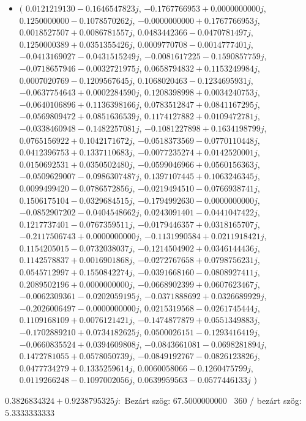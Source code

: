 \documentclass[14pt,a4paper]{article}
\begin{document}
\begin{itemize}
\item
$\big($
$0.0121219130-0.1646547823j$, $-0.1767766953+0.0000000000j$, $0.1250000000-0.1078570262j$, $-0.0000000000+0.1767766953j$, $0.0018527507+0.0086781557j$, $0.0483442366-0.0470781497j$, $0.1250000389+0.0351355426j$, $0.0009770708-0.0014777401j$, $-0.0413169027-0.0431515249j$, $-0.0081617225-0.1590857759j$, $-0.0718657946-0.0032721975j$, $0.0658794832+0.1153249984j$, $0.0007020769-0.1209567645j$, $0.1068020463-0.1234695931j$, $-0.0637754643+0.0002284590j$, $0.1208398998+0.0034240753j$, $-0.0640106896+0.1136398166j$, $0.0783512847+0.0841167295j$, $-0.0569809472+0.0851636539j$, $0.1174127882+0.0109472781j$, $-0.0338460948-0.1482257081j$, $-0.1081227898+0.1634198799j$, $0.0765156922+0.1042171672j$, $-0.0518373569-0.0770110448j$, $0.0412396753+0.1337110683j$, $-0.0077235274+0.0142520001j$, $0.0150692531+0.0350502480j$, $-0.0599046966+0.0560156363j$, $-0.0509629007-0.0986307487j$, $0.1397107445+0.1063246345j$, $0.0099499420-0.0786572856j$, $-0.0219494510-0.0766938741j$, $0.1506175104-0.0329684515j$, $-0.1794992630-0.0000000000j$, $-0.0852907202-0.0404548662j$, $0.0243091401-0.0441047422j$, $0.1217737401-0.0767359511j$, $-0.0179446357+0.0318165707j$, $-0.2117506743+0.0000000000j$, $-0.1131990584+0.0211918421j$, $0.1154205015-0.0732038037j$, $-0.1214504902+0.0346144436j$, $0.1142578837+0.0016901868j$, $-0.0272767658+0.0798756231j$, $0.0545712997+0.1550842274j$, $-0.0391668160-0.0808927411j$, $0.2089502196+0.0000000000j$, $-0.0668902399+0.0607623467j$, $-0.0062309361-0.0202059195j$, $-0.0371888692+0.0326689929j$, $-0.2026006497-0.0000000000j$, $0.0215319568-0.0261745444j$, $0.1109168109+0.0076121421j$, $-0.1474877879+0.0551349883j$, $-0.1702889210+0.0734182625j$, $0.0500026151-0.1293416419j$, $-0.0660835524+0.0394609808j$, $-0.0843661081-0.0698281894j$, $0.1472781055+0.0578050739j$, $-0.0849192767-0.0826123826j$, $0.0477734279+0.1335259614j$, $0.0060058066-0.1260475799j$, $0.0119266248-0.1097002056j$, $0.0639959563-0.0577446133j$
$\big)$
\end{itemize}
$0.3826834324+0.9238795325j$:\
Bezárt szög: $67.5000000000$ \
360 / bezárt szög: $5.3333333333$\
\end{document}
